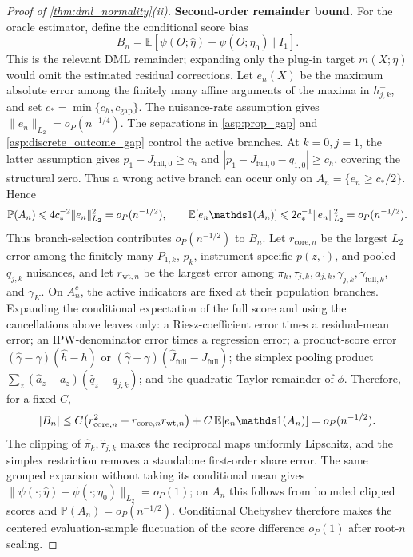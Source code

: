 \begin{proof}[Proof of \cref{thm:dml_normality}\textup{(ii)}]
\medskip
\noindent\textbf{Second-order remainder bound.}
For the oracle estimator, define the conditional score bias
\[
    B_n=\mathbb E[\psi(O;\hat\eta)-\psi(O;\eta_0)\mid I_1].
\]
This is the relevant DML remainder; expanding only the plug-in target $m(X;\eta)$ would omit the estimated residual corrections. Let $e_n(X)$ be the maximum absolute error among the finitely many affine arguments of the maxima in $h_{j,k}^-$, and set $c_*=\min\{c_h,c_{\mathrm{gap}}\}$. The nuisance-rate assumption gives $\|e_n\|_{L_2}=o_P(n^{-1/4})$. The separations in \cref{asp:prop_gap} and \cref{asp:discrete_outcome_gap} control the active branches. At $k=0,j=1$, the latter assumption gives $p_1-J_{\mathrm{full},0}\geqslant c_h$ and $|p_1-J_{\mathrm{full},0}-q_{1,0}|\geqslant c_h$, covering the structural zero. Thus a wrong active branch can occur only on $A_n=\{e_n\geqslant c_*/2\}$. Hence
\[
    \mathbb P(A_n)\leqslant 4c_*^{-2}\|e_n\|_{L_2}^2=o_P(n^{-1/2}),
    \qquad
    \mathbb E[e_n\indicator(A_n)]\leqslant 2c_*^{-1}\|e_n\|_{L_2}^2=o_P(n^{-1/2}).
\]
Thus branch-selection contributes $o_P(n^{-1/2})$ to $B_n$. Let $r_{\mathrm{core},n}$ be the largest $L_2$ error among the finitely many $P_{1,k}$, $p_k$, instrument-specific $p(z,\cdot)$, and pooled $q_{j,k}$ nuisances, and let $r_{\mathrm{wt},n}$ be the largest error among $\pi_k,\tau_{j,k},a_{j,k},\gamma_{j,k},\gamma_{\mathrm{full},k}$, and $\gamma_K$. On $A_n^c$, the active indicators are fixed at their population branches. Expanding the conditional expectation of the full score and using the cancellations above leaves only: a Riesz-coefficient error times a residual-mean error; an IPW-denominator error times a regression error; a product-score error $(\hat\gamma-\gamma)(\hat h-h)$ or $(\hat\gamma-\gamma)(\hat J_{\mathrm{full}}-J_{\mathrm{full}})$; the simplex pooling product $\sum_z(\hat a_z-a_z)(\hat q_z-q_{j,k})$; and the quadratic Taylor remainder of $\phi$. Therefore, for a fixed $C$,
\[
    |B_n|
    \le C\bigl(r_{\mathrm{core},n}^2+r_{\mathrm{core},n}r_{\mathrm{wt},n}\bigr)
       +C\,\mathbb E[e_n\indicator(A_n)]
    =o_P(n^{-1/2}).
\]
The clipping of $\hat\pi_k,\hat\tau_{j,k}$ makes the reciprocal maps uniformly Lipschitz, and the simplex restriction removes a standalone first-order share error. The same grouped expansion without taking its conditional mean gives $\|\psi(\cdot;\hat\eta)-\psi(\cdot;\eta_0)\|_{L_2}=o_P(1)$; on $A_n$ this follows from bounded clipped scores and $\mathbb P(A_n)=o_P(n^{-1/2})$. Conditional Chebyshev therefore makes the centered evaluation-sample fluctuation of the score difference $o_P(1)$ after root-$n$ scaling.


\end{proof}
